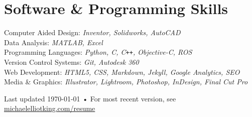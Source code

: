 \documentclass[11pt, letterpaper]{article}
\newcommand{\years}[1]{\marginnote{\footnotesize #1}} %
\begin{document}


  \section*{Software \& Programming Skills}
  Computer Aided Design: \emph{Inventor, Solidworks, AutoCAD}\\
  Data Analysis: \emph{MATLAB, Excel}\\
  Programming Languages: \emph{Python, C, C}\verb!++!\emph{, Objective-C, ROS}\\
  Version Control Systems: \emph{Git, Autodesk 360}\\
  Web Development: \emph{HTML5, CSS, Markdown, Jekyll, Google Analytics, SEO}\\
  Media \& Graphics: \emph{Illustrator, Lightroom, Photoshop, InDesign, Final Cut Pro}



\begin{center}
{\hspace{-.5in} \scriptsize Last updated \today\- •\- For most recent version, see \href{http://www.michaelelliotking.com/resume}{michaelelliotking.com/resume}}
\end{center}
\end{document}
